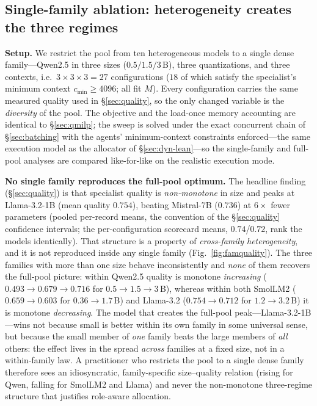 \documentclass[11pt]{article}
\begin{document}
\subsection{Single-family ablation: heterogeneity creates the three regimes}
\label{sec:family-ablation}
\textbf{Setup.} We restrict the pool from ten heterogeneous models to a single
dense family---Qwen2.5 in three sizes ($0.5/1.5/3$\,B), three quantizations, and
three contexts, i.e.\ $3\times3\times3=27$ configurations ($18$ of which satisfy the
specialist's minimum context $c_{\min}\ge4096$; all fit $M$). Every configuration carries the same measured quality used in
§\ref{sec:quality}, so the only changed variable is the \emph{diversity} of the
pool. The objective and the load-once memory accounting are identical to
§\ref{sec:qmilp}; the sweep is solved under the exact concurrent chain of
§\ref{sec:batching} with the agents' minimum-context constraints enforced---the
same execution model as the allocator of §\ref{sec:dyn-lean}---so the
single-family and full-pool analyses are compared like-for-like on the realistic
execution mode.

\textbf{No single family reproduces the full-pool optimum.} The headline finding
(§\ref{sec:quality}) is that specialist quality is \emph{non-monotone} in size and
peaks at Llama-3.2-1B (mean quality $0.754$), beating Mistral-7B ($0.736$) at
$6\times$ fewer parameters (pooled per-record means, the convention of the
§\ref{sec:quality} confidence intervals; the per-configuration scorecard means,
$0.74$/$0.72$, rank the models identically). That structure is a property of \emph{cross-family
heterogeneity}, and it is not reproduced inside any single family
(Fig.~\ref{fig:famquality}). The three families with more than one size behave
inconsistently and \emph{none} of them recovers the full-pool picture: within
Qwen2.5 quality is monotone \emph{increasing}
($0.493\rightarrow0.679\rightarrow0.716$ for $0.5\rightarrow1.5\rightarrow3$\,B),
whereas within both SmolLM2 ($0.659\rightarrow0.603$ for $0.36\rightarrow1.7$\,B)
and Llama-3.2 ($0.754\rightarrow0.712$ for $1.2\rightarrow3.2$\,B) it is monotone
\emph{decreasing}. The model that creates the full-pool peak---Llama-3.2-1B---wins
not because small is better within its own family in some universal sense, but
because the small member of \emph{one} family beats the large members of \emph{all}
others: the effect lives in the spread \emph{across} families at a fixed size, not
in a within-family law. A practitioner who restricts the pool to a single dense
family therefore sees an idiosyncratic, family-specific size--quality relation
(rising for Qwen, falling for SmolLM2 and Llama) and never the non-monotone
three-regime structure that justifies role-aware allocation.
\end{document}
